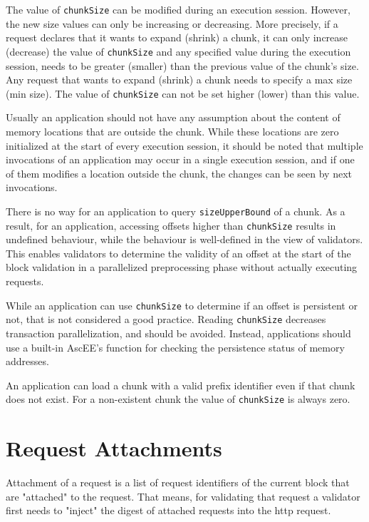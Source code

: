 The value of \texttt{chunkSize} can be modified during an execution session. However, the new size values can only be
increasing or decreasing. More precisely, if a request declares that it wants to expand (shrink) a chunk, it can only
increase (decrease) the value of \texttt{chunkSize} and any specified value during the execution
session, needs to be greater (smaller) than the previous value of the chunk's size. Any request that wants to expand
(shrink) a chunk needs to specify a max size (min size). The value of \texttt{chunkSize} can not be set higher
(lower) than this value.

Usually an application should not have any assumption about the content of memory locations that are outside the chunk.
While these locations are zero initialized at the start of every execution session, it should be noted that multiple
invocations of an application may occur in a single execution session, and if one of them modifies a location outside
the chunk, the changes can be seen by next invocations.

There is no way for an application to query \texttt{sizeUpperBound} of a chunk. As a result, for an application,
accessing offsets higher than \texttt{chunkSize} results in undefined behaviour, while the behaviour is well-defined
in the view of validators.
This enables validators to determine the validity of an offset at the start of the block validation in a parallelized
preprocessing phase without actually executing requests.

While an application can use \texttt{chunkSize} to determine if an offset is persistent or not, that is not
considered a good practice. Reading \texttt{chunkSize} decreases transaction parallelization, and should be avoided.
Instead, applications should use a built-in AscEE's function for checking the persistence status of memory addresses.

An application can load a chunk with a valid prefix identifier even if that chunk does not exist. For a non-existent
chunk the value of \texttt{chunkSize} is always zero.


\section{Request Attachments}\label{sec:attachments}

Attachment of a request is a list of request identifiers of the current block that are "attached" to the request.
That means, for validating that request a validator first needs to "inject" the digest of attached requests into the
http request.

